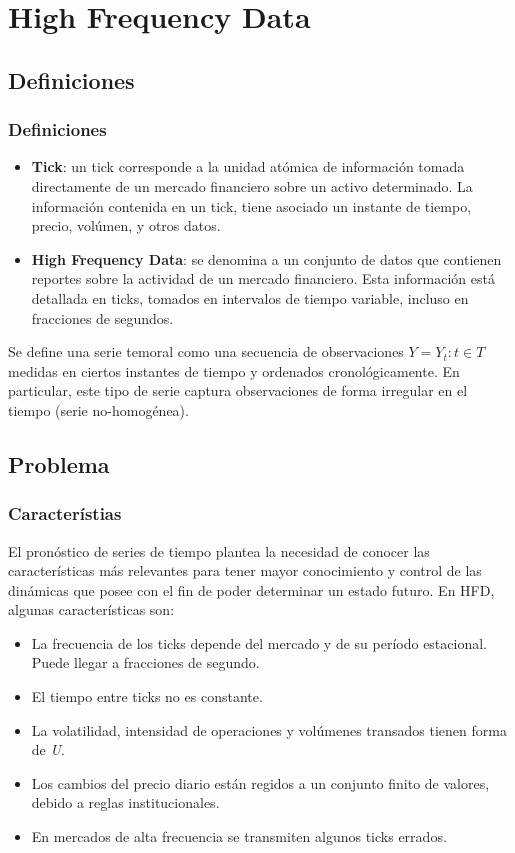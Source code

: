 \section{High Frequency Data}

\subsection{Definiciones}
\begin{frame}
\frametitle{Definiciones}

\begin{itemize}
	\item \textbf{Tick}: un tick corresponde a la unidad atómica de información
tomada directamente de un mercado financiero sobre un activo determinado. La
información contenida en un tick, tiene asociado un instante de tiempo, precio,
volúmen, y otros datos.
	\item \textbf{High Frequency Data}: se denomina a un conjunto de datos que
contienen reportes sobre la actividad de un mercado financiero. Esta
información está detallada en ticks, tomados en intervalos de tiempo variable,
incluso en fracciones de segundos.
\end{itemize}

Se define una serie temoral como una secuencia de observaciones $Y = {Y_t: t
\in T}$ medidas en ciertos instantes de tiempo y ordenados cronológicamente.
En particular, este tipo de serie captura observaciones de forma irregular en
el tiempo (serie no-homogénea).

\end{frame}

\subsection{Problema}
\begin{frame}
\frametitle{Característias}

El pronóstico de series de tiempo plantea la necesidad de conocer las
características más relevantes para tener mayor conocimiento y control de las
dinámicas que posee con el fin de poder determinar un estado futuro. En HFD,
algunas características son:

\begin{itemize}
	\item La frecuencia de los ticks depende del mercado y de su período
estacional. Puede llegar a fracciones de segundo.
	\item El tiempo entre ticks no es constante.
	\item La volatilidad, intensidad de operaciones y volúmenes transados
tienen forma de \emph{U}.
	\item Los cambios del precio diario están regidos a un conjunto finito de
valores, debido a reglas institucionales.
	\item En mercados de alta frecuencia se transmiten algunos ticks errados.
\end{itemize}

\end{frame}

